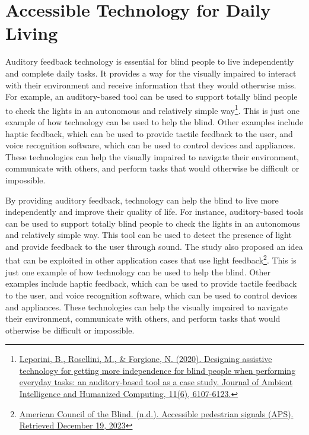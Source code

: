 \section{Accessible Technology for Daily Living}\label{ind-living}
Auditory feedback technology is essential for blind people to live independently and complete daily tasks. It provides a way for the visually impaired to interact with their environment and receive information that they would otherwise miss. For example, an auditory-based tool can be used to support totally blind people to check the lights in an autonomous and relatively simple way\footnote{\href{http://link.springer.com/article/10.1007/s12652-020-01944-w}{Leporini, B., Rosellini, M., \& Forgione, N. (2020). Designing assistive technology for getting more independence for blind people when performing everyday tasks: an auditory-based tool as a case study. Journal of Ambient Intelligence and Humanized Computing, 11(6), 6107-6123.}}. This is just one example of how technology can be used to help the blind. Other examples include haptic feedback, which can be used to provide tactile feedback to the user, and voice recognition software, which can be used to control devices and appliances. These technologies can help the visually impaired to navigate their environment, communicate with others, and perform tasks that would otherwise be difficult or impossible.

By providing auditory feedback, technology can help the blind to live more independently and improve their quality of life. For instance, auditory-based tools can be used to support totally blind people to check the lights in an autonomous and relatively simple way\footnotemark[\value{footnote}]. This tool can be used to detect the presence of light and provide feedback to the user through sound. The study also proposed an idea that can be exploited in other application cases that use light feedback\footnote{\href{http://https://www.acb.org/content/accessible-pedestrian-signals-aps/}{American Council of the Blind. (n.d.). Accessible pedestrian signals (APS). Retrieved December 19, 2023}}. This is just one example of how technology can be used to help the blind. Other examples include haptic feedback, which can be used to provide tactile feedback to the user, and voice recognition software, which can be used to control devices and appliances. These technologies can help the visually impaired to navigate their environment, communicate with others, and perform tasks that would otherwise be difficult or impossible.

